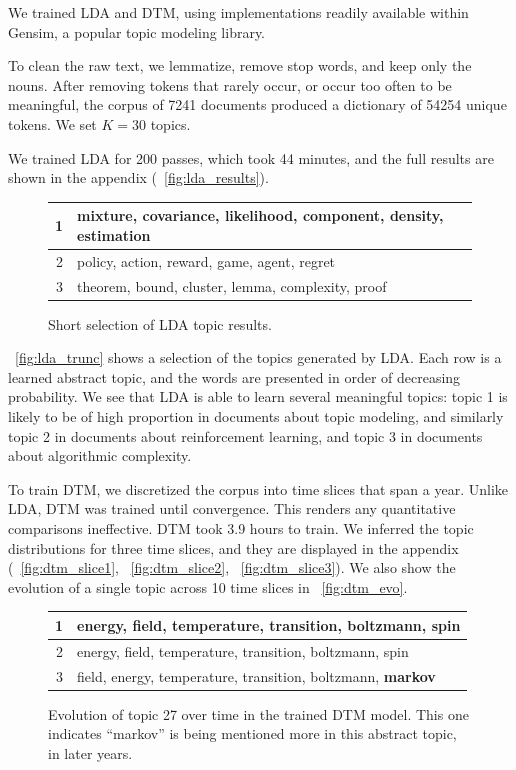 \documentclass[letterpaper]{article}
\begin{document}
We trained LDA and DTM, using implementations readily available within
Gensim, a popular topic modeling library.

To clean the raw text, we lemmatize, remove stop words, and keep only
the nouns. After removing tokens that rarely occur, or occur too often
to be meaningful, the corpus of 7241 documents produced a dictionary
of 54254 unique tokens. We set $K = 30$ topics.

We trained LDA for 200 passes, which took 44 minutes, and the full
results are shown in the appendix (~\autoref{fig:lda_results}).

\begin{figure}[ht]
  \begin{tabularx}{\linewidth}{|r | X|}
    \hline
    1 & mixture, covariance, likelihood, component, density, estimation \\ \hline
    2 & policy, action, reward, game, agent, regret \\ \hline
    3 & theorem, bound, cluster, lemma, complexity, proof \\ \hline
  \end{tabularx}
  \caption{\label{fig:lda_trunc} Short selection of LDA topic results.}
\end{figure}

~\autoref{fig:lda_trunc} shows a selection of the topics generated by
LDA. Each row is a learned abstract topic, and the words are presented
in order of decreasing probability. We see that LDA is able to learn
several meaningful topics: topic 1 is likely to be of high proportion
in documents about topic modeling, and similarly topic 2 in documents
about reinforcement learning, and topic 3 in documents about
algorithmic complexity.

To train DTM, we discretized the corpus into time slices that span a
year. Unlike LDA, DTM was trained until convergence. This renders any
quantitative comparisons ineffective. DTM took 3.9 hours to train. We
inferred the topic distributions for three time slices, and they are
displayed in the appendix (~\autoref{fig:dtm_slice1},
~\autoref{fig:dtm_slice2}, ~\autoref{fig:dtm_slice3}). We also show
the evolution of a single topic across 10 time slices in
~\autoref{fig:dtm_evo}.

\begin{figure}[ht]
  \begin{tabularx}{\linewidth}{|r | X|}
    \hline
    1 & energy, field, temperature, transition, boltzmann, spin \\ \hline
    2 & energy, field, temperature, transition, boltzmann, spin \\ \hline
    3 & field, energy, temperature, transition, boltzmann, \bf{markov}
    \\ \hline
    
  \end{tabularx}
  \caption{\label{fig:dtm_trunc} Evolution of topic 27 over time in
    the trained DTM model. This one indicates ``markov'' is being
    mentioned more in this abstract topic, in later years. }
\end{figure}
\end{document}
